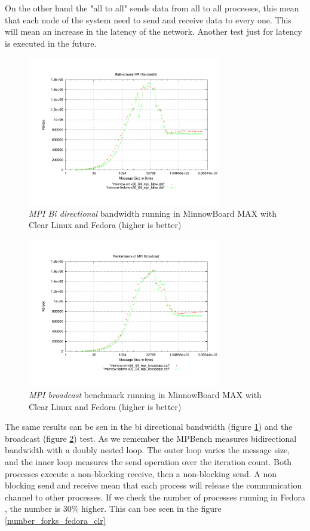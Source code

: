 On the other hand the "all to all" sends data from all to all processes, this
mean that each node of the system need to send and receive data to every one.
This will mean an increase in the latency of the network. Another test just for
latency is executed in the future. 


\begin{figure}[H]
\centering
\includegraphics[width=0.75\textwidth]{images/mpbench_clr_experiments/mpi_bibw.pdf}
\caption{\textit{MPI Bi directional} bandwidth running in  MinnowBoard MAX with Clear Linux
and Fedora (higher is better)}
\label{mpi_bibw_clr_fedora}
\end{figure}


\begin{figure}[H]
\centering
\includegraphics[width=0.75\textwidth]{images/mpbench_clr_experiments/mpi_broadcast.pdf}
\caption{\textit{MPI broadcast} benchmark running in  MinnowBoard MAX with Clear Linux and
Fedora (higher is better)}
\label{mpi_broadcast_clr_fedora}
\end{figure}

The same results can be sen in the bi directional bandwidth (figure
\ref{mpi_bibw_clr_fedora}) and the broadcast (figure
\ref{mpi_broadcast_clr_fedora}) test. As we remember the MPBench measures
bidirectional bandwidth with a doubly nested loop. The outer loop varies the
message size, and the inner loop measures the send operation over the iteration
count. Both processes execute a non-blocking receive, then a non-blocking send.
A non blocking send and receive mean that each process will release the
communication channel to other processes. If we check the number of processes
running in Fedora , the number is 30\% higher. This can bee seen in the figure
\ref{number_forks_fedora_clr}


